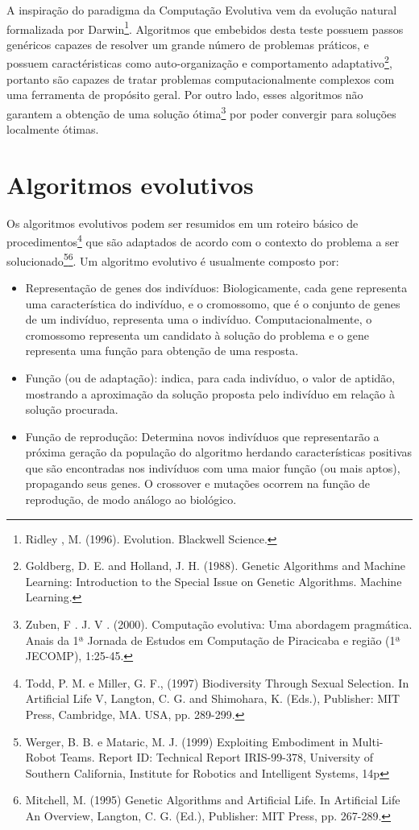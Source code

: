A inspiração do paradigma da Computação Evolutiva vem da evolução natural formalizada por Darwin\footnote
{Ridley , M. (1996). Evolution. Blackwell Science.}.
Algoritmos que embebidos desta teste possuem passos genéricos capazes de resolver um grande número de problemas práticos, e possuem caractéristicas como auto-organização e comportamento adaptativo\footnote
{Goldberg, D. E. and Holland, J. H. (1988). Genetic Algorithms and Machine Learning: Introduction to the Special Issue on Genetic Algorithms. Machine Learning.},
portanto são capazes de tratar problemas computacionalmente complexos com uma ferramenta de propósito geral. Por outro lado, esses algoritmos não garantem a obtenção de uma solução ótima\footnote
{Zuben, F . J. V . (2000). Computação evolutiva: Uma abordagem pragmática. Anais da 1ª Jornada de Estudos em Computação de Piracicaba e região (1ª JECOMP), 1:25-45.}
por poder convergir para soluções localmente ótimas.

\section{Algoritmos evolutivos}
Os algoritmos evolutivos podem ser resumidos em um roteiro básico de procedimentos\footnote
{Todd, P. M. e Miller, G. F., (1997) Biodiversity Through Sexual Selection. In Artificial Life V, Langton, C. G. and Shimohara, K. (Eds.), Publisher: MIT Press, Cambridge, MA. USA, pp. 289-299.}
que são adaptados de acordo com o contexto do problema a ser solucionado\footnote
{Werger, B. B. e Mataric, M. J. (1999) Exploiting Embodiment in Multi-Robot Teams. Report ID: Technical Report IRIS-99-378, University of Southern California, Institute for Robotics and Intelligent Systems, 14p}\footnote
{Mitchell, M. (1995) Genetic Algorithms and Artificial Life. In Artificial Life An Overview, Langton, C. G. (Ed.), Publisher: MIT Press, pp. 267-289.}.
Um algoritmo evolutivo é usualmente composto por:

\begin{itemize}
    \item Representação de genes dos indivíduos: Biologicamente, cada gene representa uma característica do indivíduo, e o cromossomo, que é o conjunto de genes de um indivíduo, representa uma o indivíduo. Computacionalmente, o cromossomo representa um candidato à solução do problema e o gene representa uma função para obtenção de uma resposta.
    \item Função \fitness (ou de adaptação): indica, para cada indivíduo, o valor de aptidão, mostrando a aproximação da solução proposta pelo indivíduo em relação à solução procurada.
    \item Função de reprodução: Determina novos indivíduos que representarão a próxima geração da população do algoritmo herdando características positivas que são encontradas nos indivíduos com uma maior função \fitness (ou mais aptos), propagando seus genes. O crossover e mutações ocorrem na função de reprodução, de modo análogo ao biológico.
\end{itemize}